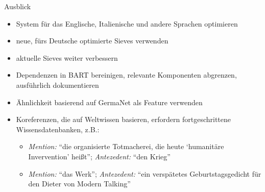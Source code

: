 \documentclass[11pt,a4paper]{beamer}
\begin{document}
\begin{frame}{Ausblick}
\begin{itemize}
\item System für das Englische, Italienische und andere Sprachen optimieren
\item neue, fürs Deutsche optimierte Sieves verwenden
\item aktuelle Sieves weiter verbessern
\item Dependenzen in BART bereinigen, relevante Komponenten abgrenzen, ausführlich dokumentieren
\item Ähnlichkeit basierend auf GermaNet als Feature verwenden
\item Koreferenzen, die auf Weltwissen basieren, erfordern fortgeschrittene Wissensdatenbanken, z.B.:\\
  \begin{itemize}
  \item \textit{Mention:} “die organisierte Totmacherei, die heute ‘humanitäre Invervention’ heißt”; \textit{Antezedent:} “den Krieg”\\
  \item \textit{Mention:} “das Werk”; \textit{Antezedent:} “ein verspätetes Geburtstagsgedicht für den Dieter von Modern Talking”\\
  \end{itemize}
\end{itemize}
\end{frame}


%
%
\end{document}
